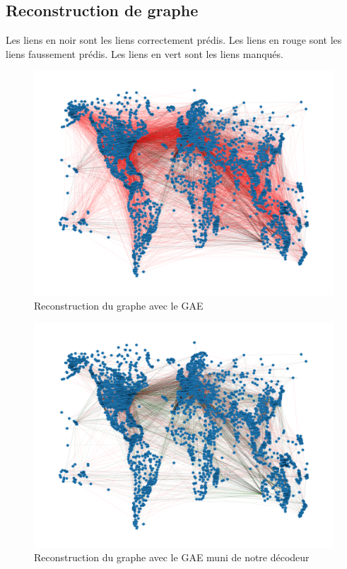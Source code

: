 \documentclass{article}
\begin{document}
\subsection{Reconstruction de graphe}

Les liens en noir sont les liens correctement prédis.\newline
Les liens en rouge sont les liens faussement prédis.\newline
Les liens en vert sont les liens manqués.

\begin{figure}[H]
    \centering
    \includegraphics[width=1\linewidth]{../graphiques/GCN.png}
    \caption{Reconstruction du graphe avec le GAE}
    \label{fig:fig_graphe_GAE}
\end{figure}

\begin{figure}[H]
    \centering
    \includegraphics[width=1\linewidth]{../graphiques/GCNwithDecoder.png}
    \caption{Reconstruction du graphe avec le GAE muni de notre décodeur}
    \label{fig:fig_graphe_GAE_with_decodeur}
\end{figure}
\end{document}
